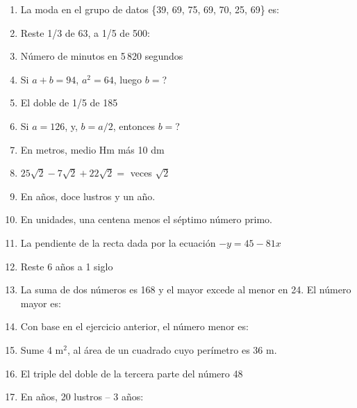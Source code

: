 \documentclass[letterpaper,11pt,twoside]{article}
\begin{document}
\begin{multicols}{2}
\begin{enumerate}
\item La moda en el grupo de datos \{39, 69, 75, 69, 70, 25, 69\} es:
\item Reste 1/3 de 63, a 1/5 de 500:
\item Número de minutos en 5\,820 segundos
\item Si $a+b=94$, $a^{2}=64$, luego $b=$?
\item El doble de 1/5 de 185
\item Si $a=126$, y, $b=a/2$, entonces $b=$?
\item En metros, medio Hm más 10 dm
\item $25\sqrt{2}-7\sqrt{2}+22\sqrt{2}=$ \underline{\hspace{.7cm}} veces $\sqrt{2}$
\item En años, doce lustros y un año.
\item En unidades, una centena menos el séptimo número primo.
\item La pendiente de la recta dada por la ecuación $-y=45-81x$
\item Reste 6 años a 1 siglo
\item La suma de dos números es 168 y el mayor excede al menor en 24. El número mayor es:
\item Con base en el ejercicio anterior, el número menor es:
\item Sume 4 m$^{2}$, al área de un cuadrado cuyo perímetro es 36 m.
\item El triple del doble de la tercera parte del número 48
\item En años, 20 lustros -- 3 años:
\end{enumerate}
\end{multicols}
\end{document}
